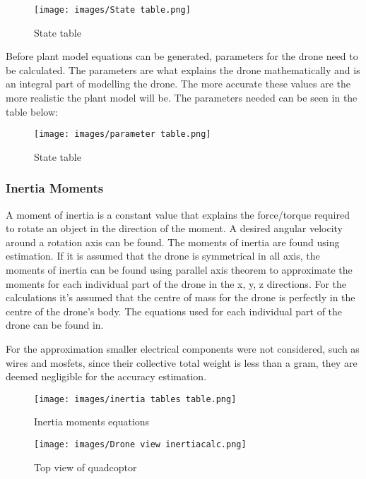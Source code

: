 \documentclass{article}
\begin{document}
\begin{figure}[H]
\begin{center}
    \texttt{[image: images/State table.png]}
\end{center}
\caption{State table}
\end{figure}

Before plant model equations can be generated, parameters for the drone need to be calculated. The parameters are what explains the drone mathematically and is an integral part of modelling the drone. The more accurate these values are the more realistic the plant model will be.
The parameters needed can be seen in the table below:\cite{Ferry}

\begin{figure}[H]
\begin{center}
    \texttt{[image: images/parameter table.png]}
\end{center}
\caption{State table}
\end{figure}

\subsubsection{Inertia Moments}
A moment of inertia is a constant value that explains the force/torque required to rotate an object in the direction of the moment. A desired angular velocity around a rotation axis can be found. The moments of inertia are found using estimation. If it is assumed that the drone is symmetrical in all axis, the moments of inertia can be found using parallel axis theorem to approximate the moments for each individual part of the drone in the x, y, z directions. For the calculations it’s assumed that the centre of mass for the drone is perfectly in the centre of the drone’s body.
The equations used for each individual part of the drone can be found in. \cite{Ferry}

For the approximation smaller electrical components were not considered, such as wires and mosfets, since their collective total weight is less than a gram, they are deemed negligible for the accuracy estimation.

\begin{figure}[H]
\begin{center}
   \texttt{[image: images/inertia tables table.png]}
\end{center}
\caption{Inertia moments equations}
\end{figure}

\begin{figure}[H]
\begin{center}
   \texttt{[image: images/Drone view inertiacalc.png]}
\end{center}
\caption{Top view of quadcoptor}
\end{figure}
\end{document}
